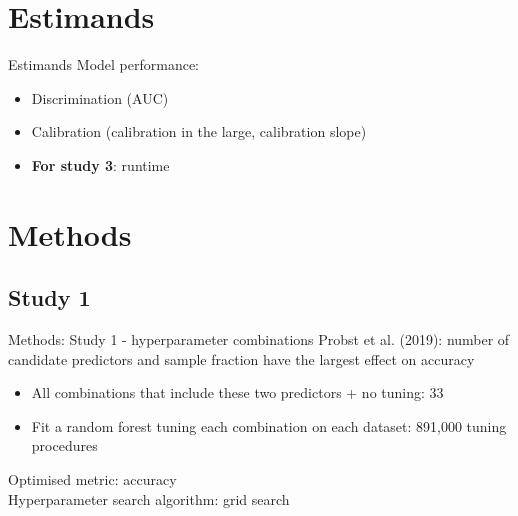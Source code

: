 \documentclass[aspectratio=169]{beamer} %
\begin{document}
\section{Estimands}

\begin{frame}{Estimands}
    Model performance:\begin{itemize}
        \item Discrimination (AUC)
        \item Calibration (calibration in the large, calibration slope)
        \item \textbf{For study 3}: runtime
    \end{itemize}
\end{frame}

\section{Methods}

\subsection{Study 1}

\begin{frame}{Methods: Study 1 - hyperparameter combinations}
    Probst et al. (2019): number of candidate predictors and sample fraction have the largest effect on accuracy\\
    \begin{itemize}
        \item All combinations that include these two predictors + no tuning: 33
        \item Fit a random forest tuning each combination on each dataset: 891,000 tuning procedures
    \end{itemize}
    Optimised metric: accuracy\\
    Hyperparameter search algorithm: grid search
\end{frame}
\end{document}
